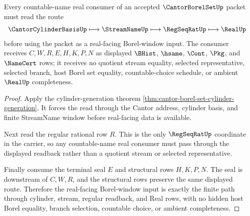 \begin{theorem}
\label{thm:cantor-borel-set-real-route}
Every countable-name real consumer of an accepted $\CantorBorelSetUp$ packet must read the route
$$
\CantorCylinderBasisUp \longmapsto \StreamNameUp \longmapsto
\RegSeqRatUp \longmapsto \RealUp
$$
before using the packet as a real-facing Borel-window input. The consumer receives $C,W,R,E,H,K,P,N$ as displayed $\BHist$, $\hsame$, $\Cont$, $\Pkg$, and $\NameCert$ rows; it receives no quotient stream equality, selected representative, selected branch, host Borel set equality, countable-choice schedule, or ambient $\RealUp$ completeness.
\end{theorem}
\begin{proof}
Apply the cylinder-generation theorem \autoref{thm:cantor-borel-set-cylinder-generation}. It forces the read through the Cantor address, cylinder basis, and finite StreamName window before real-facing data is available.

Next read the regular rational row $R$. This is the only $\RegSeqRatUp$ coordinate in the carrier, so any countable-name real consumer must pass through the displayed readback rather than a quotient stream or selected representative.

Finally consume the terminal seal $E$ and structural rows $H,K,P,N$. The seal is downstream of $C,W,R$, and the structural rows preserve the same displayed route. Therefore the real-facing Borel-window input is exactly the finite path through cylinder, stream, regular readback, and Real rows, with no hidden host Borel equality, branch selection, countable choice, or ambient completeness.
\end{proof}


\begin{closurestatus}{\CantorBorelSetUp}
  \theoryclosure{\seedClosure}
  \formalstatus{\unformalizedV}
\end{closurestatus}
